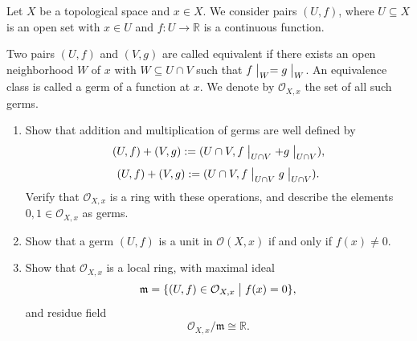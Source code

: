 \begin{prob}
    Let $X$ be a topological space and $x \in X$. 
    We consider pairs $(U,f)$, where $U \subseteq X$ is an open 
    set with $x \in U$ and $f : U \to \mathbb R$ is a 
    continuous function. 

    Two pairs $(U,f)$ and $(V,g)$ are called equivalent if 
    there exists an open neighborhood $W$ of $x$ with 
    $W \subseteq U \cap V$ such that 
    $f\bigm|_W = g\bigm|_W$. An equivalence class is called 
    a germ of a function at $x$. We denote by $\mathcal O_{X,x}$ 
    the set of all such germs. 

    \begin{enumerate}[label=(\alph*)]
        \item Show that addition and multiplication of germs 
            are well defined by 
            \[
                (U,f) + (V,g) 
                := (U \cap V, f\bigm|_{U\cap V} 
                + g\bigm|_{U\cap V}), 
            \]
            \[
                (U,f) + (V,g) 
                := (U \cap V, f\bigm|_{U\cap V} 
                g\bigm|_{U\cap V}). 
            \]
            Verify that $\mathcal O_{X,x}$ is a ring 
            with these operations, and describe the 
            elements $0,1 \in \mathcal O_{X,x}$ as germs. 
        \item Show that a germ $(U,f)$ is a unit in 
            $\mathcal O(X,x)$ if and only if $f(x) \neq 0$. 
        \item Show that $\mathcal O_{X,x}$ is a local ring, 
            with maximal ideal 
            \[
                \mathfrak m = \{(U,f)\in \mathcal O_{X,x} 
                \bigm| f(x) = 0\}, 
            \]
            and residue field 
            \[
                \mathcal O_{X,x}/\mathfrak m \cong \mathbb R.
            \]
    \end{enumerate}
\end{prob}
